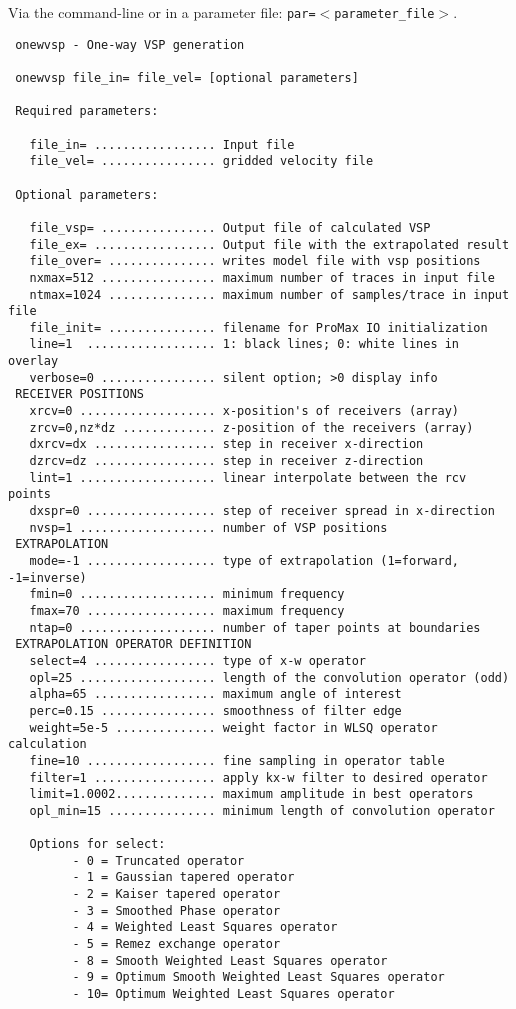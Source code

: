 Via the command-line or in a parameter file: {\tt par=$<$parameter\_file$>$}.
{\footnotesize
\begin{verbatim}
 onewvsp - One-way VSP generation
 
 onewvsp file_in= file_vel= [optional parameters]
 
 Required parameters:
 
   file_in= ................. Input file
   file_vel= ................ gridded velocity file 
 
 Optional parameters:
 
   file_vsp= ................ Output file of calculated VSP
   file_ex= ................. Output file with the extrapolated result
   file_over= ............... writes model file with vsp positions
   nxmax=512 ................ maximum number of traces in input file
   ntmax=1024 ............... maximum number of samples/trace in input file
   file_init= ............... filename for ProMax IO initialization
   line=1  .................. 1: black lines; 0: white lines in overlay
   verbose=0 ................ silent option; >0 display info
 RECEIVER POSITIONS 
   xrcv=0 ................... x-position's of receivers (array)
   zrcv=0,nz*dz ............. z-position of the receivers (array)
   dxrcv=dx ................. step in receiver x-direction
   dzrcv=dz ................. step in receiver z-direction
   lint=1 ................... linear interpolate between the rcv points
   dxspr=0 .................. step of receiver spread in x-direction
   nvsp=1 ................... number of VSP positions
 EXTRAPOLATION 
   mode=-1 .................. type of extrapolation (1=forward, -1=inverse)
   fmin=0 ................... minimum frequency
   fmax=70 .................. maximum frequency
   ntap=0 ................... number of taper points at boundaries
 EXTRAPOLATION OPERATOR DEFINITION 
   select=4 ................. type of x-w operator
   opl=25 ................... length of the convolution operator (odd)
   alpha=65 ................. maximum angle of interest
   perc=0.15 ................ smoothness of filter edge
   weight=5e-5 .............. weight factor in WLSQ operator calculation
   fine=10 .................. fine sampling in operator table
   filter=1 ................. apply kx-w filter to desired operator
   limit=1.0002.............. maximum amplitude in best operators
   opl_min=15 ............... minimum length of convolution operator
  
   Options for select:
         - 0 = Truncated operator
         - 1 = Gaussian tapered operator
         - 2 = Kaiser tapered operator
         - 3 = Smoothed Phase operator
         - 4 = Weighted Least Squares operator
         - 5 = Remez exchange operator
         - 8 = Smooth Weighted Least Squares operator
         - 9 = Optimum Smooth Weighted Least Squares operator
         - 10= Optimum Weighted Least Squares operator
 

\end{verbatim}}
